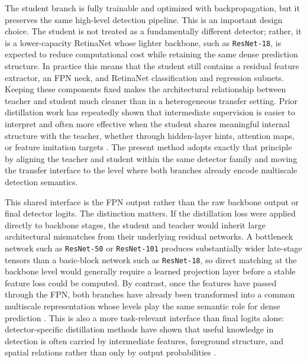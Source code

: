 The student branch is fully trainable and optimized with backpropagation, but it preserves the same high-level detection pipeline. This is an important design choice. The student is not treated as a fundamentally different detector; rather, it is a lower-capacity RetinaNet whose lighter backbone, such as \texttt{ResNet-18}, is expected to reduce computational cost while retaining the same dense prediction structure. In practice this means that the student still contains a residual feature extractor, an FPN neck, and RetinaNet classification and regression subnets. Keeping these components fixed makes the architectural relationship between teacher and student much cleaner than in a heterogeneous transfer setting. Prior distillation work has repeatedly shown that intermediate supervision is easier to interpret and often more effective when the student shares meaningful internal structure with the teacher, whether through hidden-layer hints, attention maps, or feature imitation targets \cite{romero2015fitnets,zagoruyko2017paying,chen2017learning,wang2019distilling,yang2022focal}. The present method adopts exactly that principle by aligning the teacher and student within the same detector family and moving the transfer interface to the level where both branches already encode multiscale detection semantics.

This shared interface is the FPN output rather than the raw backbone output or final detector logits. The distinction matters. If the distillation loss were applied directly to backbone stages, the student and teacher would inherit large architectural mismatches from their underlying residual networks. A bottleneck network such as \texttt{ResNet-50} or \texttt{ResNet-101} produces substantially wider late-stage tensors than a basic-block network such as \texttt{ResNet-18}, so direct matching at the backbone level would generally require a learned projection layer before a stable feature loss could be computed. By contrast, once the features have passed through the FPN, both branches have already been transformed into a common multiscale representation whose levels play the same semantic role for dense prediction \cite{lin2017fpn}. This is also a more task-relevant interface than final logits alone: detector-specific distillation methods have shown that useful knowledge in detection is often carried by intermediate features, foreground structure, and spatial relations rather than only by output probabilities \cite{wang2019distilling,dai2021gid,guo2021defeat,kang2021icd,du2021frs,li2022rank,yang2022focal}.

